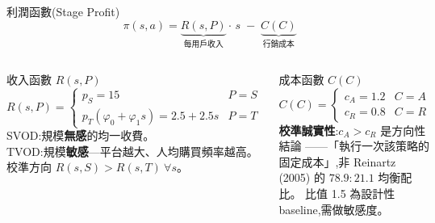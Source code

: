 \documentclass[aspectratio=169,11pt,fontset=none]{ctexbeamer}
\begin{document}
\begin{frame}{利潤函數(Stage Profit)}
  \[
    \pi(s,a)=\underbrace{R(s,P)}_{\text{每用戶收入}}\cdot\, s \;-\; \underbrace{C(C)}_{\text{行銷成本}}
  \]
  \begin{columns}[t]
      \begin{block}{收入函數 $R(s,P)$}
        \[
          R(s,P)=\begin{cases} p_S = 15 & P=S\\[0.3em]
          p_T(\varphi_0+\varphi_1 s)=2.5+2.5s & P=T\end{cases}
        \]
        \footnotesize SVOD:規模\textbf{無感}的均一收費。\\
        TVOD:規模\textbf{敏感}—平台越大、人均購買頻率越高。\\
        校準方向 $R(s,S)>R(s,T)\ \forall s$。
      \end{block}
      \begin{block}{成本函數 $C(C)$}
        \[ C(C)=\begin{cases} c_A=1.2 & C=A\\ c_R=0.8 & C=R\end{cases} \]
        \footnotesize \textbf{校準誠實性}:$c_A>c_R$ 是{\color{ottred}方向性}結論
        ——「執行一次該策略的固定成本」,非 Reinartz (2005) 的 $78.9\!:\!21.1$ 均衡配比。
        比值 1.5 為設計性 baseline,需做敏感度。
      \end{block}
  \end{columns}
\end{frame}
\end{document}
